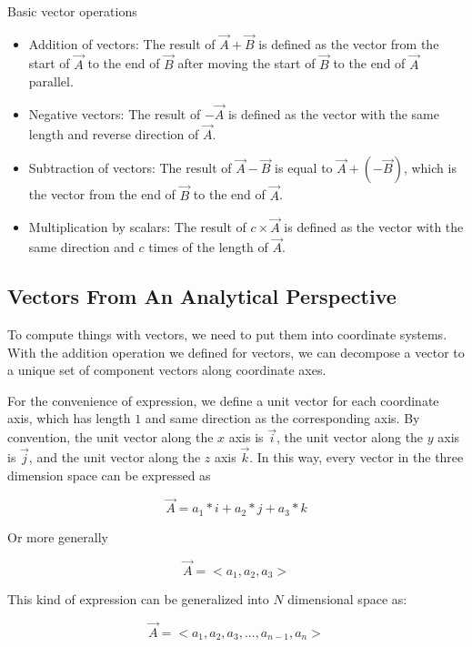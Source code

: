 \documentclass{article}
\begin{document}
Basic vector operations
\begin{itemize}
	\item Addition of vectors: The result of $\vec{A} + \vec{B}$ is defined as
	the vector from the start of $\vec{A}$ to the end of $\vec{B}$ after
	moving the start of $\vec{B}$ to the end of $\vec{A}$ parallel.
	
	\item Negative vectors: The result of $-\vec{A}$ is defined as the vector
	with the same length and reverse direction of $\vec{A}$.
	
	\item Subtraction of vectors: The result of $\vec{A} - \vec{B}$ is equal to
	$\vec{A} + (-\vec{B})$, which is the vector from the end of $\vec{B}$ to
	the end of $\vec{A}$.
	
	\item Multiplication by scalars: The result of $c \times \vec{A}$ is
	defined as the vector with the same direction and $c$ times of the length
	of $\vec{A}$. 
\end{itemize}

\subsection{Vectors From An Analytical Perspective}

To compute things with vectors, we need to put them into coordinate systems.
With the addition operation we defined for vectors, we can decompose a vector
to a unique set of component vectors along coordinate axes.

For the convenience of expression, we define a unit vector for each coordinate
axis, which has length $1$ and same direction as the corresponding axis. By
convention, the unit vector along the $x$ axis is $\vec{i}$, the unit vector
along the $y$ axis is $\vec{j}$, and the unit vector along the $z$ axis
$\vec{k}$. In this way, every vector in the three dimension space can be
expressed as

\[ \vec{A} = a_{1} * i + a_{2} * j + a_{3} * k \]

Or more generally

\[ \vec{A} = <a_{1}, a_{2}, a_{3}> \]

This kind of expression can be generalized into $N$ dimensional space as:

\[ \vec{A} = <a_{1}, a_{2}, a_{3}, ..., a_{n-1}, a_{n}> \]

\bigskip
\end{document}
